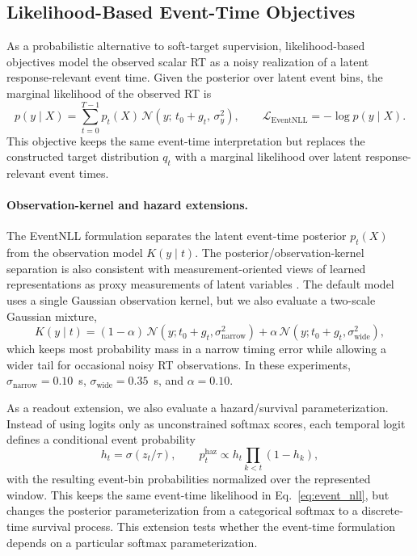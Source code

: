 \documentclass[12pt]{article}
\begin{document}
\subsection{Likelihood-Based Event-Time Objectives}
\label{sec:event_nll}

As a probabilistic alternative to soft-target supervision, likelihood-based objectives model the observed scalar RT as a noisy realization of a latent response-relevant event time. Given the posterior over latent event bins, the marginal likelihood of the observed RT is
\begin{equation}
\label{eq:event_nll}
p(y\mid X)
= \sum_{t=0}^{T-1} p_t(X)\,
\mathcal{N}\!\left(y;\,t_0 + g_t,\,\sigma_y^2\right),
\qquad
\mathcal{L}_{\mathrm{EventNLL}} = -\log p(y\mid X).
\end{equation}
This objective keeps the same event-time interpretation but replaces the constructed target distribution $q_t$ with a marginal likelihood over latent response-relevant event times.

\paragraph{Observation-kernel and hazard extensions.}
The EventNLL formulation separates the latent event-time posterior $p_t(X)$ from the observation model $K(y\mid t)$. The posterior/observation-kernel separation is also consistent with measurement-oriented views of learned representations as proxy measurements of latent variables \citep{Yao2025ThirdPillar}. The default model uses a single Gaussian observation kernel, but we also evaluate a two-scale Gaussian mixture,
\begin{equation}
\label{eq:event_nll_mixture_kernel}
K(y\mid t)=(1-\alpha)\,\mathcal{N}(y;t_0+g_t,\sigma_{\mathrm{narrow}}^2)
+\alpha\,\mathcal{N}(y;t_0+g_t,\sigma_{\mathrm{wide}}^2),
\end{equation}
which keeps most probability mass in a narrow timing error while allowing a wider tail for occasional noisy RT observations. In these experiments, $\sigma_{\mathrm{narrow}}=0.10$~s, $\sigma_{\mathrm{wide}}=0.35$~s, and $\alpha=0.10$.

As a readout extension, we also evaluate a hazard/survival parameterization. Instead of using logits only as unconstrained softmax scores, each temporal logit defines a conditional event probability
\begin{equation}
\label{eq:hazard_readout}
h_t=\sigma(z_t/\tau),\qquad
p_t^{\mathrm{haz}} \propto h_t\prod_{k<t}(1-h_k),
\end{equation}
with the resulting event-bin probabilities normalized over the represented window. This keeps the same event-time likelihood in Eq.~\ref{eq:event_nll}, but changes the posterior parameterization from a categorical softmax to a discrete-time survival process. This extension tests whether the event-time formulation depends on a particular softmax parameterization.
\end{document}
